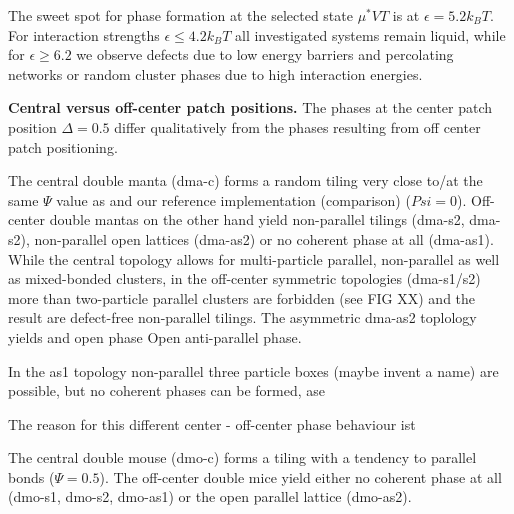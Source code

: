 \documentclass[a4paper,preprint]{revtex4}
\begin{document}
The sweet spot for phase formation at the selected state $\mu^{*}VT$ is at $\epsilon = 5.2 k_{B}T$. For interaction strengths $\epsilon \leq  4.2 k_{B}T$ all investigated systems remain liquid, while for $\epsilon \geq 6.2$ we observe defects due to low energy barriers and percolating networks or random cluster phases due to high interaction energies. 



\textbf{Central versus off-center patch positions.}
The phases at the center patch position $\Delta=0.5$ differ qualitatively from the phases resulting from off center patch positioning. 


The central double manta (dma-c) forms a random tiling very close to/at the same $\Psi$ value as \cite{Whitlam2012} and our reference implementation (comparison) ($Psi=0$).
Off-center double mantas on the other hand yield non-parallel tilings (dma-s2, dma-s2), non-parallel open lattices (dma-as2) or no coherent phase at all (dma-as1).
While the central topology allows for multi-particle parallel, non-parallel as well as mixed-bonded clusters, in the off-center symmetric topologies (dma-s1/s2) more than two-particle parallel clusters are forbidden (see FIG XX) and the result are defect-free non-parallel tilings.
The asymmetric dma-as2 toplology yields and open phase 
Open anti-parallel phase. 

In the as1 topology non-parallel three particle boxes (maybe invent a name) are possible, but no coherent phases can be formed,
ase 





The reason for this different center - off-center phase behaviour ist 




The central double mouse (dmo-c) forms a tiling with a tendency to parallel bonds ($\Psi = 0.5$). The off-center double mice yield either no coherent phase at all (dmo-s1, dmo-s2, dmo-as1) or the open parallel lattice (dmo-as2). 
\end{document}
